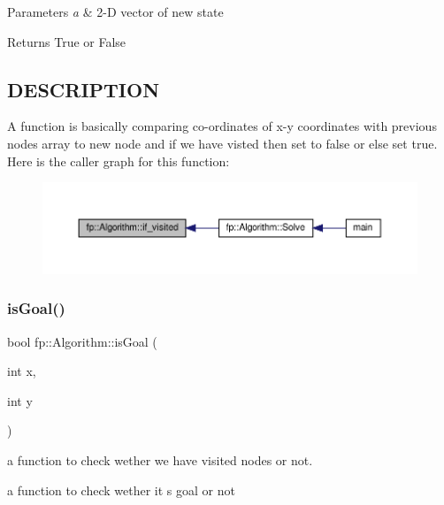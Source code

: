 \begin{DoxyParams}{Parameters}
{\em a} & 2-\/D vector of new state \\
\hline
\end{DoxyParams}
\begin{DoxyReturn}{Returns}
True or False 
\end{DoxyReturn}
\hypertarget{_m_a_z_e_8h_DESCRIPTION}{}\subsection{D\+E\+S\+C\+R\+I\+P\+T\+I\+ON}\label{_m_a_z_e_8h_DESCRIPTION}
A function is basically comparing co-\/ordinates of x-\/y coordinates with previous nodes array to new node and if we have visted then set to false or else set true. Here is the caller graph for this function\+:
\nopagebreak
\begin{figure}[H]
\begin{center}
\leavevmode
\includegraphics[width=350pt]{classfp_1_1_algorithm_aa7083be9be18b81bedf9bcc9976e97af_icgraph}
\end{center}
\end{figure}
\mbox{\label{classfp_1_1_algorithm_a237fc28eed2899786cd06f4e5a0e7333}} 
\subsubsection{\texorpdfstring{is\+Goal()}{isGoal()}}
{\footnotesize\ttfamily bool fp\+::\+Algorithm\+::is\+Goal (\begin{DoxyParamCaption}\item[{int}]{x,  }\item[{int}]{y }\end{DoxyParamCaption})}



a function to check wether we have visited nodes or not. 

a function to check wether it s goal or not


